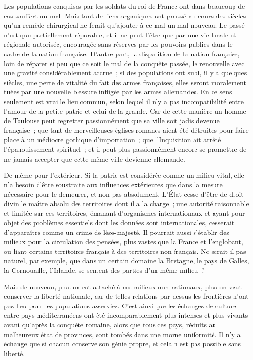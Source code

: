\documentclass[french,twoside]{book} %
\begin{document}
Les populations conquises par les soldats du roi de France ont dans beaucoup de cas souffert un mal. Mais tant de liens organiques ont poussé au cours des siècles qu'un remède chirurgical ne ferait qu'ajouter à ce mal un mal nouveau. Le passé n'est que partiellement réparable, et il ne peut l'être que par une vie locale et régionale autorisée, encouragée sans réserves par les pouvoirs publics dans le cadre de la nation française. D'autre part, la disparition de la nation française, loin de réparer si peu que ce soit le mal de la conquête passée, le renouvelle avec une gravité considérablement accrue ; si des populations ont subi, il y a quelques siècles, une perte de vitalité du fait des armes françaises, elles seront moralement tuées par une nouvelle blessure infligée par les armes allemandes. En ce sens seulement est vrai le lieu commun, selon lequel il n'y a pas incompatibilité entre l'amour de la petite patrie et celui de la grande. Car de cette manière un homme de Toulouse peut regretter passionnément que sa ville soit jadis devenue française ; que tant de merveilleuses églises romanes aient été détruites pour faire place à un médiocre gothique d'importation ; que l'Inquisition ait arrêté l'épanouissement spirituel ; et il peut plus passionnément encore se promettre de ne jamais accepter que cette même ville devienne allemande.\par
De même pour l'extérieur. Si la patrie est considérée comme un milieu vital, elle n'a besoin d'être soustraite aux influences extérieures que dans la mesure nécessaire pour le demeurer, et non pas absolument. L'État cesse d'être de droit divin le maître absolu des territoires dont il a la charge ; une autorité raisonnable et limitée sur ces territoires, émanant d'organismes internationaux et ayant pour objet des problèmes essentiels dont les données sont internationales, cesserait d'apparaître comme un crime de lèse-majesté. Il pourrait aussi s'établir des milieux pour la circulation des pensées, plus vastes que la France et l'englobant, ou liant certains territoires français à des territoires non français. Ne serait-il pas naturel, par exemple, que dans un certain domaine la Bretagne, le pays de Galles, la Cornouaille, l'Irlande, se sentent des parties d'un même milieu ?\par
Mais de nouveau, plus on est attaché à ces milieux non nationaux, plus on veut conserver la liberté nationale, car de telles relations par-dessus les frontières n'ont pas lieu pour les populations asservies. C'est ainsi que les échanges de culture entre pays méditerranéens ont été incomparablement plus intenses et plus vivants avant qu'après la conquête romaine, alors que tous ces pays, réduits au malheureux état de provinces, sont tombés dans une morne uniformité. Il n'y a échange que si chacun conserve son génie propre, et cela n'est pas possible sans liberté.\par
\end{document}
